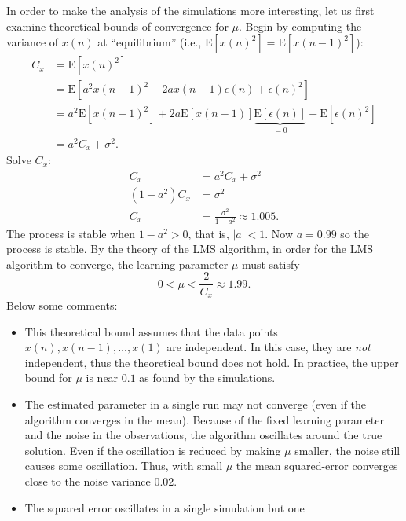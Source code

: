 \begin{enumerate}
  \begin{solution}

    In order to make the analysis of the simulations more interesting,
    let us first examine theoretical bounds of convergence for $\mu$.
    Begin by computing the variance of $x(n)$ at ``equilibrium''
    (i.e., $\mathrm{E}[x(n)^2]=\mathrm{E}[x(n-1)^2]$):
    \begin{align*}
      C_x &= \mathrm{E}[x(n)^2]
      \\
      &= \mathrm{E}[a^2x(n-1)^2 + 2ax(n-1)\epsilon(n) + \epsilon(n)^2]
      \\
      &= a^2\mathrm{E}[x(n-1)^2] +
      2a\mathrm{E}[x(n-1)]\underbrace{\mathrm{E}[\epsilon(n)]}_{=0} +
      \mathrm{E}[\epsilon(n)^2]
      \\
      &= a^2 C_x + \sigma^2.
    \end{align*}
    Solve $C_x$:
    \begin{align*}
      C_x &= a^2C_x + \sigma^2
      \\
      (1-a^2)C_x &= \sigma^2
      \\
      C_x &= \frac{\sigma^2}{1-a^2} \approx 1.005.
    \end{align*}
    The process is stable when $1-a^2>0$, that is, $|a|<1$. Now
    $a=0.99$ so the process is stable.  By the theory of the LMS
    algorithm, in order for the LMS algorithm to converge, the
    learning parameter $\mu$ must satisfy
    \begin{equation*}
      0 < \mu < \frac{2}{C_x} \approx 1.99.
    \end{equation*}
    Below some comments:
    \begin{itemize}
    \item This theoretical bound assumes that the data points
      $x(n),x(n-1),\ldots,x(1)$ are independent.  In this case, they
      are \emph{not} independent, thus the theoretical bound does not
      hold.  In practice, the upper bound for $\mu$ is near $0.1$ as
      found by the simulations.
    \item The estimated parameter in a single run may not converge
      (even if the algorithm converges in the mean).  Because of the
      fixed learning parameter and the noise in the observations, the
      algorithm oscillates around the true solution.  Even if the
      oscillation is reduced by making $\mu$ smaller, the noise still
      causes some oscillation.  Thus, with small $\mu$ the mean
      squared-error converges close to the noise variance $0.02$.
    \item The squared error oscillates in a single simulation but one

\end{itemize}
\end{solution}
\end{enumerate}
